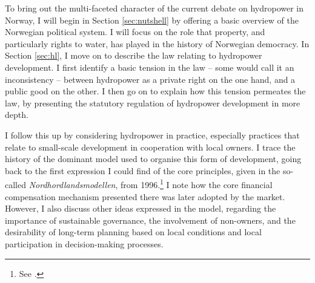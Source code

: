 %

To bring out the multi-faceted character of the current debate on hydropower in Norway, I will begin in Section \ref{sec:nutshell} by offering a basic overview of the Norwegian political system. I will focus on the role that property, and particularly rights to water, has played in the history of Norwegian democracy. In Section \ref{sec:hl}, I move on to describe the law relating to hydropower development. I first identify a basic tension in the law -- some would call it an inconsistency -- between hydropower as a private right on the one hand, and a public good on the other. I then go on to explain how this tension permeates the law, by presenting the statutory regulation of hydropower development in more depth.

I follow this up by considering hydropower in practice, especially practices that relate to small-scale development in cooperation with local owners. I trace the history of the dominant model used to organise this form of development, going back to the first expression I could find of the core principles, given in the so-called {\it Nordhordlandsmodellen}, from 1996.\footnote{See \cite{dyrkolbotn96}.} I note how the core financial compensation mechanism presented there was later adopted by the market. However, I also discuss other ideas expressed in the model, regarding the importance of sustainable governance, the involvement of non-owners, and the desirability of long-term planning based on local conditions and local participation in decision-making processes.

